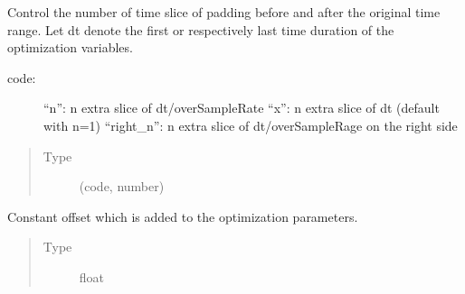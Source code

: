 \documentclass[letterpaper,10pt,english]{sphinxmanual}
\begin{document}
\begin{fulllineitems}
\begin{fulllineitems}
\begin{quote}
\begin{description}
\end{description}\end{quote}

\end{fulllineitems}


\begin{fulllineitems}
\label{\detokenize{qsim:qsim.transfer_function.TransferFunction.bound_type}}
Control the number of time slice of padding before and after the
original time range. Let dt denote the first or respectively last time
duration of the optimization variables.
\begin{description}
\item[{code:}] \leavevmode
“n”: n extra slice of dt/overSampleRate
“x”: n extra slice of dt (default with n=1)
“right\_n”: n extra slice of dt/overSampleRage on the right side

\end{description}
\begin{quote}\begin{description}
\item[{Type}] \leavevmode
(code, number)

\end{description}\end{quote}

\end{fulllineitems}


\begin{fulllineitems}
\label{\detokenize{qsim:qsim.transfer_function.TransferFunction.offset}}
Constant offset which is added to the optimization parameters.
\begin{quote}\begin{description}
\item[{Type}] \leavevmode
float

\end{description}\end{quote}

\end{fulllineitems}



\end{fulllineitems}
\end{document}
